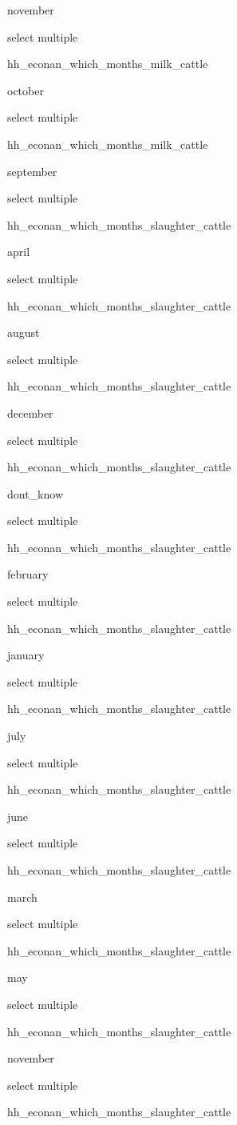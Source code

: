 \documentclass[]{article}
\begin{document}
november

select multiple

hh\_econan\_which\_months\_milk\_cattle

october

select multiple

hh\_econan\_which\_months\_milk\_cattle

september

select multiple

hh\_econan\_which\_months\_slaughter\_cattle

april

select multiple

hh\_econan\_which\_months\_slaughter\_cattle

august

select multiple

hh\_econan\_which\_months\_slaughter\_cattle

december

select multiple

hh\_econan\_which\_months\_slaughter\_cattle

dont\_know

select multiple

hh\_econan\_which\_months\_slaughter\_cattle

february

select multiple

hh\_econan\_which\_months\_slaughter\_cattle

january

select multiple

hh\_econan\_which\_months\_slaughter\_cattle

july

select multiple

hh\_econan\_which\_months\_slaughter\_cattle

june

select multiple

hh\_econan\_which\_months\_slaughter\_cattle

march

select multiple

hh\_econan\_which\_months\_slaughter\_cattle

may

select multiple

hh\_econan\_which\_months\_slaughter\_cattle

november

select multiple

hh\_econan\_which\_months\_slaughter\_cattle
\end{document}
